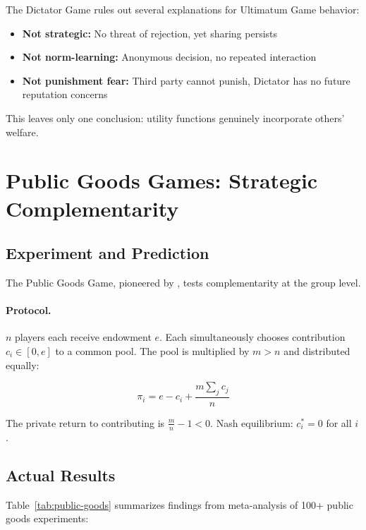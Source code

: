 \documentclass[12pt,oneside]{book}
\begin{document}
The Dictator Game rules out several explanations for Ultimatum Game behavior:
\begin{itemize}
  \item \textbf{Not strategic:} No threat of rejection, yet sharing persists
  \item \textbf{Not norm-learning:} Anonymous decision, no repeated interaction
  \item \textbf{Not punishment fear:} Third party cannot punish, Dictator has no future reputation concerns
\end{itemize}

This leaves only one conclusion: utility functions genuinely incorporate others' welfare.

\section{Public Goods Games: Strategic Complementarity}

\subsection{Experiment and Prediction}

The Public Goods Game, pioneered by \citet{fehrgaechter2000}, tests complementarity at the group level.

\paragraph{Protocol.} $n$ players each receive endowment $e$. Each simultaneously chooses
contribution $c_i \in [0, e]$ to a common pool. The pool is multiplied by $m > n$ and
distributed equally:

\begin{equation}
\pi_i = e - c_i + \frac{m \sum_j c_j}{n}
\label{eq:public-goods}
\end{equation}

The private return to contributing is $\frac{m}{n} - 1 < 0$. Nash equilibrium: $c_i^* = 0$ for all $i$.

\subsection{Actual Results}

Table~\ref{tab:public-goods} summarizes findings from meta-analysis of 100+ public goods experiments:
\end{document}

